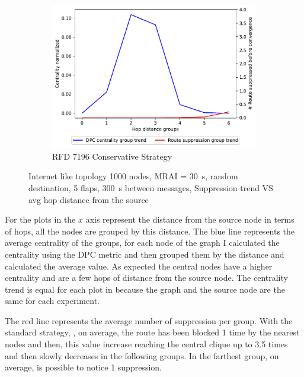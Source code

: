 \begin{figure}[h]
     \hfill
     \begin{subfigure}[b]{0.49\textwidth}
         \centering
         \includegraphics[width=\textwidth]{images/RFD/miceVSelephants/mice/cisco_1000_RFD_7196_conservative_nodeConvergence_centVSsup_trend.pdf}
         \caption{RFD 7196 Conservative Strategy}
         \label{fig:1000_7196RFDC_centVSsup}
     \end{subfigure}
		\caption{Internet like topology \num{1000} nodes, \ac{MRAI} = \SI{30}{\second},
		random destination, \num{5} flaps, \SI{300}{\second} between messages,
		Suppression trend VS avg hop distance from the source}
        \label{fig:1000_RFD_centVSsup}
\end{figure}

For the plots in  the $x$ axis represent the distance
from the source node in terms of hops, all the nodes are grouped by this
distance.
The blue line represents the average centrality of the groups, for each node of the
graph I calculated the centrality using the \ac{DPC} metric and then grouped them
by the distance and calculated the average value.
As expected the central nodes have a higher centrality and are a few hops
of distance from the source node.
The centrality trend is equal for each plot in 
because the graph and the source node are the same for each experiment.

The red line represents the average number of suppression per group.
With the standard strategy, ,
on average, the route has been blocked \num{1} time by the nearest nodes and then,
this value increase reaching the central clique up to \num{3.5} times and then
slowly decreases in the following groups.
In the farthest group, on average, is possible to notice \num{1} suppression.

